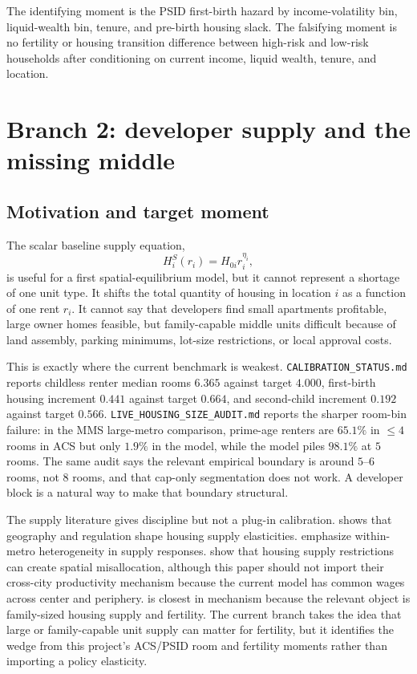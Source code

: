 \documentclass[11pt]{article}
\begin{document}
The identifying moment is the PSID first-birth hazard by income-volatility bin, liquid-wealth bin, tenure, and pre-birth housing slack. The falsifying moment is no fertility or housing transition difference between high-risk and low-risk households after conditioning on current income, liquid wealth, tenure, and location.

\section{Branch 2: developer supply and the missing middle}

\subsection{Motivation and target moment}

The scalar baseline supply equation,
\begin{equation}
    H_i^S(r_i)=H_{0i}r_i^{\eta_i},
\end{equation}
is useful for a first spatial-equilibrium model, but it cannot represent a shortage of one unit type. It shifts the total quantity of housing in location $i$ as a function of one rent $r_i$. It cannot say that developers find small apartments profitable, large owner homes feasible, but family-capable middle units difficult because of land assembly, parking minimums, lot-size restrictions, or local approval costs.

This is exactly where the current benchmark is weakest. \texttt{CALIBRATION\_STATUS.md} reports childless renter median rooms $6.365$ against target $4.000$, first-birth housing increment $0.441$ against target $0.664$, and second-child increment $0.192$ against target $0.566$. \texttt{LIVE\_HOUSING\_SIZE\_AUDIT.md} reports the sharper room-bin failure: in the MMS large-metro comparison, prime-age renters are $65.1\%$ in $\leq4$ rooms in ACS but only $1.9\%$ in the model, while the model piles $98.1\%$ at $5$ rooms. The same audit says the relevant empirical boundary is around $5$--$6$ rooms, not $8$ rooms, and that cap-only segmentation does not work. A developer block is a natural way to make that boundary structural.

The supply literature gives discipline but not a plug-in calibration. \citet{saiz2010} shows that geography and regulation shape housing supply elasticities. \citet{baumSnowHan2024} emphasize within-metro heterogeneity in supply responses. \citet{hsiehMoretti2019} show that housing supply restrictions can create spatial misallocation, although this paper should not import their cross-city productivity mechanism because the current model has common wages across center and periphery. \citet{couillard2025} is closest in mechanism because the relevant object is family-sized housing supply and fertility. The current branch takes the idea that large or family-capable unit supply can matter for fertility, but it identifies the wedge from this project's ACS/PSID room and fertility moments rather than importing a policy elasticity.
\end{document}

